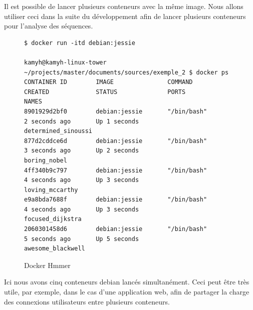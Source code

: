 Il est possible de lancer plusieurs conteneurs avec la même image. Nous allons utiliser ceci dans la suite du développement afin de lancer plusieurs conteneurs pour l'analyse des séquences.

\begin{figure}[H] 
\centering 
\begin{lstlisting}[frame=single]
$ docker run -itd debian:jessie

kamyh@kamyh-linux-tower ~/projects/master/documents/sources/exemple_2 $ docker ps
CONTAINER ID        IMAGE               COMMAND             CREATED             STATUS              PORTS               NAMES
8901929d2bf0        debian:jessie       "/bin/bash"         2 seconds ago       Up 1 seconds                            determined_sinoussi
877d2cddce6d        debian:jessie       "/bin/bash"         3 seconds ago       Up 2 seconds                            boring_nobel
4ff340b9c797        debian:jessie       "/bin/bash"         4 seconds ago       Up 3 seconds                            loving_mccarthy
e9a8bda7688f        debian:jessie       "/bin/bash"         4 seconds ago       Up 3 seconds                            focused_dijkstra
2060301458d6        debian:jessie       "/bin/bash"         5 seconds ago       Up 5 seconds                            awesome_blackwell
\end{lstlisting}
\caption[Docker Hmmer]{Docker Hmmer}
\label{fig:dockerHmmer} 
\end{figure}

Ici nous avons cinq conteneurs debian lancés simultanément. Ceci peut être très utile, par exemple, dans le cas d'une application web, afin de partager la charge des connexions utilisateurs entre plusieurs conteneurs.
































